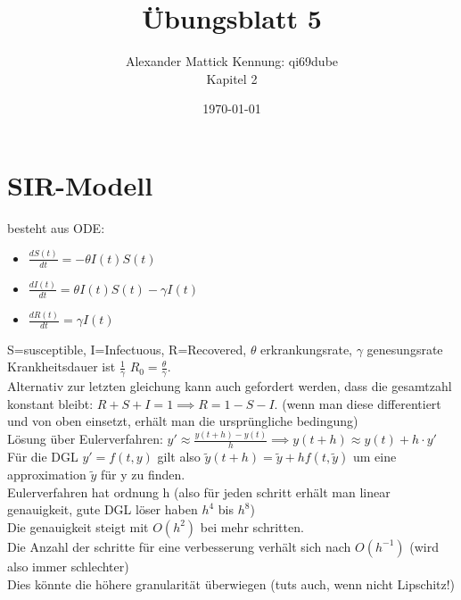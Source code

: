 \documentclass{article}
\title{Übungsblatt 5}
\author{
Alexander Mattick Kennung: qi69dube\\
Kapitel 2
}
\date{\today}
\begin{document}
	\maketitle
	\section{SIR-Modell}
	besteht aus ODE:\\
	\begin{itemize}
		\item $\frac{dS(t)}{dt} = -\theta I(t)S(t)$
		\item $\frac{dI(t)}{dt} = \theta I(t)S(t)-\gamma I(t)$
		\item $\frac{dR(t)}{dt} = \gamma I(t)$
	\end{itemize}
	S=susceptible, I=Infectuous, R=Recovered, $\theta$ erkrankungsrate, $\gamma$ genesungsrate\\
	Krankheitsdauer ist $\frac{1}{\gamma}$ $R_0 = \frac{\theta}{\gamma}$.\\
	Alternativ zur letzten gleichung kann auch gefordert werden, dass die gesamtzahl konstant bleibt: $R+S+I=1\implies R= 1-S-I$. (wenn man diese differentiert und von oben einsetzt, erhält man die ursprüngliche bedingung)\\
	Lösung über Eulerverfahren: $y'\approx \frac{y(t+h)-y(t)}{h}\implies y(t+h)\approx y(t)+h\cdot y'$\\
	Für die DGL	$y'=f(t,y)$ gilt also $\tilde y(t+h)= \tilde y+hf(t,\tilde y)$ um eine approximation $\tilde y$ für y zu finden.\\
	Eulerverfahren hat ordnung h (also für jeden schritt erhält man linear genauigkeit, gute DGL löser haben $h^4$ bis $h^8$)\\
	Die genauigkeit steigt mit $O(h^2)$ bei mehr schritten.\\
	Die Anzahl der schritte für eine verbesserung verhält sich nach $O(h^{-1})$ (wird also immer schlechter)\\
	Dies könnte die höhere granularität überwiegen (tuts auch, wenn nicht Lipschitz!)\\
\end{document}
